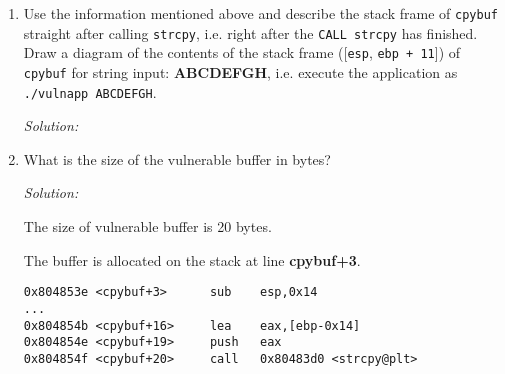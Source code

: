 \documentclass[a4paper,11pt]{article}
\newenvironment{solution}%
{\par{\noindent\small\textit{Solution:}}\vspace{-12pt}\begin{framed}}%
{\end{framed}\par}
\begin{document}
\begin{enumerate}
\begin{solution}
\verb|eip at ...|: The address where the \texttt{eip} register of the caller function is saved. It represents the \emph{extended instruction pointer} which points to the address of the next instruction of the caller function.


\end{solution}\fi

\item Use the information mentioned above and describe the stack frame of \texttt{cpybuf}
straight after calling \texttt{strcpy}, i.e. right after the \texttt{CALL
strcpy} has finished. Draw a diagram of the contents of the stack frame 
([\texttt{esp}, \texttt{ebp + 11}]) of \texttt{cpybuf} for string input:
\textbf{ABCDEFGH}, i.e. execute the application as \texttt{./vulnapp ABCDEFGH}.


\ifsolution\begin{solution}


\end{solution}\fi

\item What is the size of the vulnerable buffer in bytes?


\ifsolution\begin{solution}
The size of vulnerable buffer is 20 bytes.

\newpage

The buffer is allocated on the stack at line \textbf{cpybuf+3}.
\begin{lstlisting}
0x804853e <cpybuf+3>      sub    esp,0x14 
...
0x804854b <cpybuf+16>     lea    eax,[ebp-0x14]
0x804854e <cpybuf+19>     push   eax
0x804854f <cpybuf+20>     call   0x80483d0 <strcpy@plt>
\end{lstlisting}

\end{solution}\fi

\end{enumerate}
\end{document}
